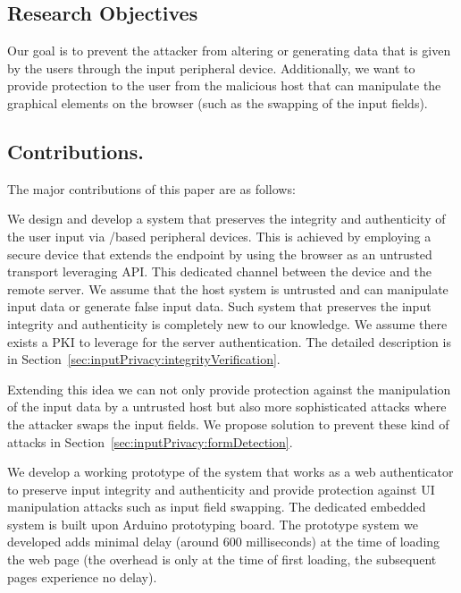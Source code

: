 \subsection{Research Objectives}

Our goal is to prevent the attacker from altering or generating data that is given by the users through the input peripheral device. Additionally, we want to provide protection to the user from the malicious host that can manipulate the graphical elements on the browser (such as the swapping of the input fields).


\subsection{Contributions.} The major contributions of this paper are as follows:


 \mypara We design and develop a system that preserves the integrity and authenticity of the user input via \usb/\bluetooth based peripheral devices. This is achieved by employing a secure \usb device that extends the \tls endpoint by using the browser as an untrusted transport leveraging \webusb API. This dedicated \tls channel between the \usb device and the remote server. We assume that the host system is untrusted and can manipulate input data or generate false input data. Such system that preserves the input integrity and authenticity is completely new to our knowledge. We assume there exists a PKI to leverage for the server authentication. The detailed description is in Section~\ref{sec:inputPrivacy:integrityVerification}.

\mypara Extending this idea we can not only provide protection against the manipulation of the input data by a untrusted host but also more sophisticated attacks where the attacker swaps the input fields. We propose solution to prevent these kind of attacks in Section~\ref{sec:inputPrivacy:formDetection}. 
  
\mypara We develop a working prototype of the system that works as a web authenticator to preserve input integrity and authenticity and provide protection against UI manipulation attacks such as input field swapping. The dedicated embedded system is built upon Arduino prototyping board. The prototype system we developed adds minimal delay (around $600$ milliseconds) at the time of loading the web page (the overhead is only at the time of first loading, the subsequent pages experience no delay). 



